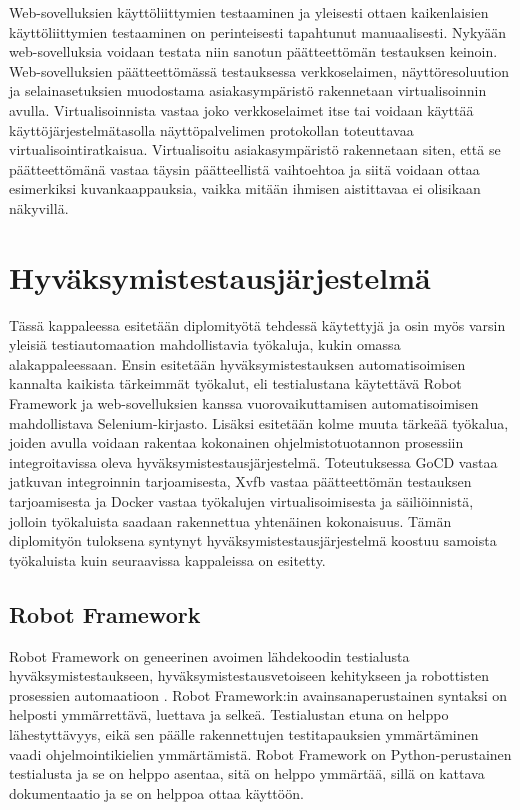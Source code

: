   Web-sovelluksien käyttöliittymien testaaminen ja yleisesti ottaen kaikenlaisien käyttöliittymien testaaminen on perinteisesti tapahtunut manuaalisesti.
  Nykyään web-sovelluksia voidaan testata niin sanotun päätteettömän testauksen keinoin.
  Web-sovelluksien päätteettömässä testauksessa verkkoselaimen, näyttöresoluution ja selainasetuksien muodostama asiakasympäristö rakennetaan virtualisoinnin avulla.
  Virtualisoinnista vastaa joko verkkoselaimet itse tai voidaan käyttää käyttöjärjestelmätasolla näyttöpalvelimen protokollan toteuttavaa virtualisointiratkaisua.
  Virtualisoitu asiakasympäristö rakennetaan siten, että se päätteettömänä vastaa täysin päätteellistä vaihtoehtoa ja siitä voidaan ottaa esimerkiksi kuvankaappauksia, vaikka mitään ihmisen aistittavaa ei olisikaan näkyvillä.

\section{Hyväksymistestausjärjestelmä} \label{ch:08_hyvaksymistestausjarjestelma}

  Tässä kappaleessa esitetään diplomityötä tehdessä käytettyjä ja osin myös varsin yleisiä testiautomaation mahdollistavia työkaluja, kukin omassa alakappaleessaan.
  Ensin esitetään hyväksymistestauksen automatisoimisen kannalta kaikista tärkeimmät työkalut, eli testialustana käytettävä Robot Framework ja web-sovelluksien kanssa vuorovaikuttamisen automatisoimisen mahdollistava Selenium-kirjasto.
  Lisäksi esitetään kolme muuta tärkeää työkalua, joiden avulla voidaan rakentaa kokonainen ohjelmistotuotannon prosessiin integroitavissa oleva hyväksymistestausjärjestelmä.
  Toteutuksessa GoCD vastaa jatkuvan integroinnin tarjoamisesta, Xvfb vastaa päätteettömän testauksen tarjoamisesta ja Docker vastaa työkalujen virtualisoimisesta ja säiliöinnistä, jolloin työkaluista saadaan rakennettua yhtenäinen kokonaisuus.
  Tämän diplomityön tuloksena syntynyt hyväksymistestausjärjestelmä koostuu samoista työkaluista kuin seuraavissa kappaleissa on esitetty.

  \subsection{Robot Framework} \label{ch:08_robot_framework}

    Robot Framework on geneerinen avoimen lähdekoodin testialusta hyväksymistestaukseen, hyväksymistestausvetoiseen kehitykseen ja robottisten prosessien automaatioon \parencite{noauthor_robot_nodate}.
    Robot Framework:in avainsanaperustainen syntaksi on helposti ymmärrettävä, luettava ja selkeä.
    Testialustan etuna on helppo lähestyttävyys, eikä sen päälle rakennettujen testitapauksien ymmärtäminen vaadi ohjelmointikielien ymmärtämistä.
    Robot Framework on Python-perustainen testialusta ja se on helppo asentaa, sitä on helppo ymmärtää, sillä on kattava dokumentaatio ja se on helppoa ottaa käyttöön.

